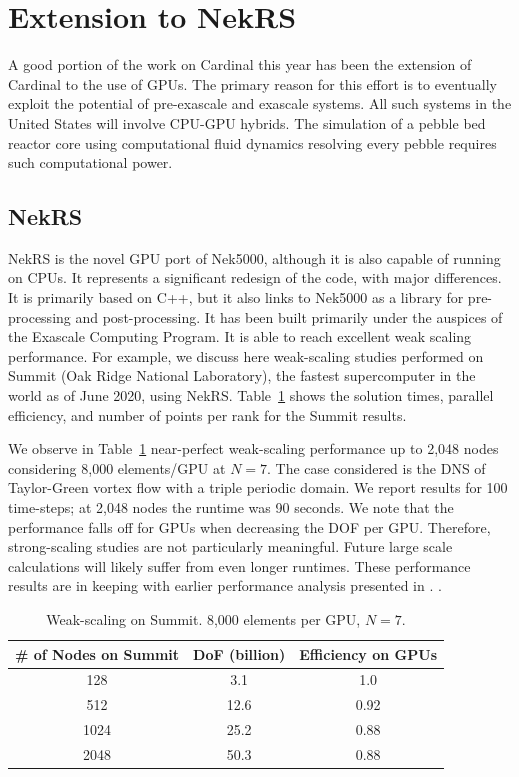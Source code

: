 \section{Extension to NekRS}
\label{s:nrs}

A good portion of the work on Cardinal this year has been the extension of Cardinal to the use of GPUs. The primary reason for this effort is to eventually exploit the potential of pre-exascale and exascale systems.
All such systems in the United States will involve CPU-GPU hybrids. The simulation of a pebble bed reactor core using computational fluid dynamics resolving every pebble requires such computational power.

\subsection{NekRS}

NekRS is the novel GPU port of Nek5000, although it is also capable of running on CPUs. It represents a significant redesign of the code, with major differences. It is primarily based on C++, but it also links to Nek5000 as a library for pre-processing and post-processing. It has been built primarily under the auspices of the Exascale Computing Program. It is able to reach excellent weak scaling performance. For example, we discuss here weak-scaling studies performed on Summit (Oak Ridge National Laboratory), the fastest supercomputer in the world as of June 2020, using NekRS. Table~\ref{wscaling} shows the solution times, parallel efficiency, and number of points per rank for the Summit results.

We observe in Table~\ref{wscaling} near-perfect weak-scaling performance up to 2,048 nodes considering 8,000 elements/GPU at $N=7$. The case considered is the DNS of Taylor-Green vortex flow with a triple periodic domain. We report results for 100 time-steps; at 2,048 nodes the runtime was 90 seconds. We note that the performance falls off for GPUs when decreasing the DOF per GPU.  Therefore, strong-scaling studies are not particularly meaningful. Future large scale calculations will likely suffer from even longer runtimes. These performance results are in keeping with earlier performance analysis presented in \cite{fischer15,min2015a}. .

\begin{table} [!b]
\begin{center} \begin{tabular}{ccc}
\toprule
\# of Nodes on Summit & DoF (billion) &  Efficiency on GPUs \\
\midrule
 128  & 3.1  & 1.0   \\
 512  & 12.6 & 0.92  \\
 1024 & 25.2 & 0.88  \\
 2048 & 50.3 & 0.88 \\
\bottomrule \end{tabular} \end{center}
\caption{\label{wscaling} Weak-scaling on Summit. 8,000 elements per GPU, $N=7$.}
\end{table}

